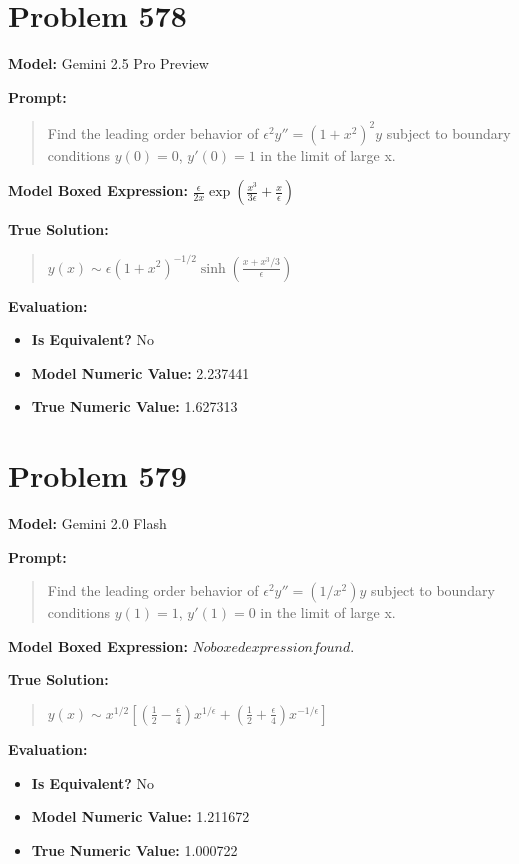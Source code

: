 \documentclass{article}
\begin{document}
\section*{Problem 578}
\textbf{Model:} Gemini 2.5 Pro Preview

\textbf{Prompt:}
\begin{quote}
Find the leading order behavior of $\epsilon^2 y'' = (1+x^2)^2 y$ subject to boundary conditions $y(0) = 0$, $y'(0)= 1$ in the limit of large x.
\end{quote}
\textbf{Model Boxed Expression:} $\frac{\epsilon}{2x} \exp\left(\frac{x^3}{3\epsilon} + \frac{x}{\epsilon}\right)$

\textbf{True Solution:}
\begin{quote}
$y(x) \sim \epsilon (1+x^2)^{-1/2} \sinh\left(\frac{x+x^3/3}{\epsilon}\right)$
\end{quote}

\textbf{Evaluation:}
\begin{itemize}
\item \textbf{Is Equivalent?} No
\item \textbf{Model Numeric Value:} 2.237441
\item \textbf{True Numeric Value:} 1.627313
\end{itemize}
\vspace{1cm}
\section*{Problem 579}
\textbf{Model:} Gemini 2.0 Flash

\textbf{Prompt:}
\begin{quote}
Find the leading order behavior of $\epsilon^2 y'' = (1/x^2) y$ subject to boundary conditions $y(1) = 1$, $y'(1)= 0$ in the limit of large x.
\end{quote}
\textbf{Model Boxed Expression:} $No boxed expression found.$

\textbf{True Solution:}
\begin{quote}
$y(x) \sim x^{1/2}[(\frac{1}{2}-\frac{\epsilon}{4})x^{1/\epsilon}+(\frac{1}{2}+\frac{\epsilon}{4})x^{-1/\epsilon}]$
\end{quote}

\textbf{Evaluation:}
\begin{itemize}
\item \textbf{Is Equivalent?} No
\item \textbf{Model Numeric Value:} 1.211672
\item \textbf{True Numeric Value:} 1.000722
\end{itemize}
\vspace{1cm}
\end{document}
